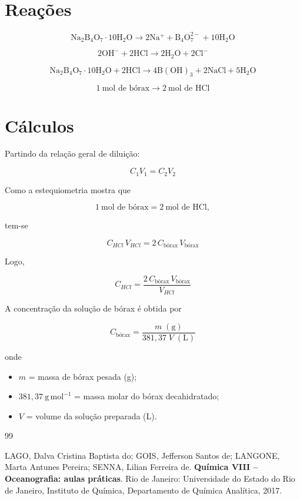 \documentclass[a4paper,12pt]{article}
\begin{document}
\newpage

\section*{Reações}

\[
\mathrm{Na_2B_4O_7\cdot10H_2O
\rightarrow
2Na^+
+
B_4O_7^{2-}
+
10H_2O}
\]

\[
\mathrm{2OH^-
+
2HCl
\rightarrow
2H_2O
+
2Cl^-}
\]

\[
\boxed{
\mathrm{
Na_2B_4O_7\cdot10H_2O
+
2HCl
\rightarrow
4B(OH)_3
+
2NaCl
+
5H_2O
}
}
\]

\[
\boxed{
1\ \text{mol de bórax}
\longrightarrow
2\ \text{mol de HCl}
}
\]

\section*{Cálculos}

Partindo da relação geral de diluição:

\[
C_1V_1=C_2V_2
\]

Como a estequiometria mostra que

\[
1\ \text{mol de bórax}
=
2\ \text{mol de HCl},
\]

tem-se

\[
C_{HCl}\,V_{HCl}
=
2\,C_{\text{bórax}}\,V_{\text{bórax}}
\]

Logo,

\[
\boxed{
C_{HCl}
=
\frac{
2\,C_{\text{bórax}}\,V_{\text{bórax}}
}{
V_{HCl}
}
}
\]

A concentração da solução de bórax é obtida por

\[
\boxed{
C_{\text{bórax}}
=
\frac{m\;(\mathrm{g})}
{381,37\;V\;(\mathrm{L})}
}
\]

onde

\begin{itemize}
\item $m$ = massa de bórax pesada (g);
\item $381,37\ \mathrm{g\,mol^{-1}}$ = massa molar do bórax decahidratado;
\item $V$ = volume da solução preparada (L).
\end{itemize}

\newpage
{}
{}
\begin{thebibliography}{99}

LAGO, Dalva Cristina Baptista do;
GOIS, Jefferson Santos de;
LANGONE, Marta Antunes Pereira;
SENNA, Lilian Ferreira de.
\textbf{Química VIII -- Oceanografia: aulas práticas}.
Rio de Janeiro: Universidade do Estado do Rio de Janeiro, Instituto de Química, Departamento de Química Analítica, 2017.

\end{thebibliography}
\end{document}
